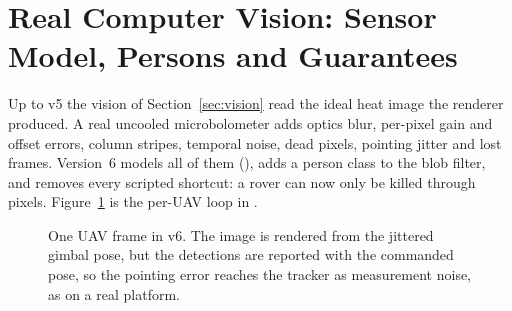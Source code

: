 \section{Real Computer Vision: Sensor Model, Persons and Guarantees}\label{sec:realcv}
Up to v5 the vision of Section~\ref{sec:vision} read the ideal heat image the renderer produced. A real uncooled microbolometer adds optics blur, per-pixel gain and offset errors, column stripes, temporal noise, dead pixels, pointing jitter and lost frames. Version~6 models all of them (), adds a person class to the blob filter, and removes every scripted shortcut: a rover can now only be killed through pixels. Figure~\ref{fig:sensorchain} is the per-UAV loop in .
\begin{figure}[h]
\centering
{}
\caption{One UAV frame in v6. The image is rendered from the jittered gimbal pose, but the detections are reported with the commanded pose, so the pointing error reaches the tracker as measurement noise, as on a real platform.}\label{fig:sensorchain}
\end{figure}

